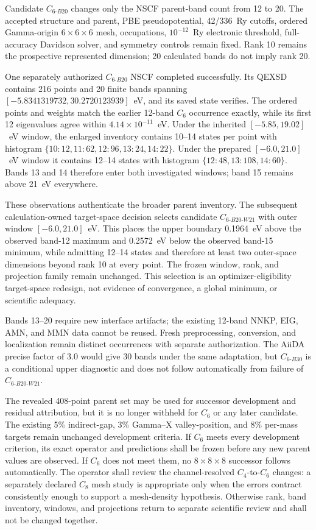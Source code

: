 \documentclass[11pt]{article}
\begin{document}
Candidate $C_{6\text{-}B20}$ changes only the NSCF parent-band count from 12 to 20.
The accepted structure and parent, PBE pseudopotential, 42/336~Ry cutoffs, ordered
Gamma-origin $6\times6\times6$ mesh, occupations, $10^{-12}$~Ry electronic threshold,
full-accuracy Davidson solver, and symmetry controls remain fixed.  Rank 10 remains the
prospective represented dimension; 20 calculated bands do not imply rank 20.

One separately authorized $C_{6\text{-}B20}$ NSCF completed successfully.  Its QEXSD
contains 216 points and 20 finite bands spanning $[-5.8341319732,30.2720123939]$~eV,
and its saved state verifies.  The ordered points and weights match the earlier
12-band $C_6$ occurrence exactly, while its first 12 eigenvalues agree within
$4.14\times10^{-11}$~eV.  Under the inherited $[-5.85,19.02]$~eV window, the enlarged
inventory contains 10--14 states per point with histogram
$\{10\!:\!12,11\!:\!62,12\!:\!96,13\!:\!24,14\!:\!22\}$.  Under the prepared
$[-6.0,21.0]$~eV window it contains 12--14 states with histogram
$\{12\!:\!48,13\!:\!108,14\!:\!60\}$.  Bands 13 and 14 therefore enter both
investigated windows; band 15 remains above 21~eV everywhere.

These observations authenticate the broader parent inventory.  The subsequent
calculation-owned target-space decision selects candidate
$C_{6\text{-}B20\text{-}W21}$ with outer window $[-6.0,21.0]$~eV.  This places the
upper boundary 0.1964~eV above the observed band-12 maximum and 0.2572~eV below the
observed band-15 minimum, while admitting 12--14 states and therefore at least two
outer-space dimensions beyond rank 10 at every point.  The frozen window, rank, and
projection family remain unchanged.  This selection is an optimizer-eligibility
target-space redesign, not evidence of convergence, a global minimum, or scientific
adequacy.

Bands 13--20 require new interface artifacts; the existing 12-band NNKP, EIG, AMN, and
MMN data cannot be reused.  Fresh preprocessing, conversion, and localization remain
distinct occurrences with separate authorization.  The AiiDA precise factor of 3.0
would give 30 bands under the same adaptation, but $C_{6\text{-}B30}$ is a conditional
upper diagnostic and does not follow automatically from failure of
$C_{6\text{-}B20\text{-}W21}$.

The revealed 408-point parent set may be used for successor development and residual
attribution, but it is no longer withheld for $C_6$ or any later candidate.  The
existing 5\% indirect-gap, 3\% Gamma--X valley-position, and 8\% per-mass targets remain
unchanged development criteria.  If $C_6$ meets every development criterion, its exact
operator and predictions shall be frozen before any new parent values are observed.  If
$C_6$ does not meet them, no $8\times8\times8$ successor follows automatically.  The
operator shall review the channel-resolved $C_4$-to-$C_6$ changes: a separately declared
$C_8$ mesh study is appropriate only when the errors contract consistently enough to
support a mesh-density hypothesis.  Otherwise rank, band inventory, windows, and
projections return to separate scientific review and shall not be changed together.
\end{document}
